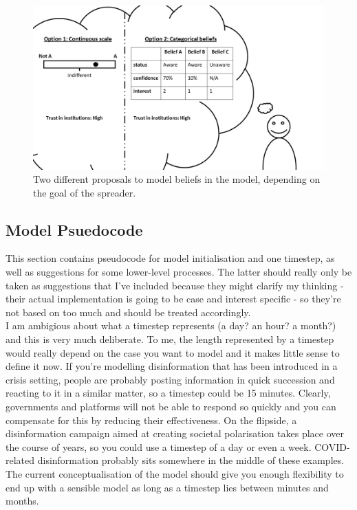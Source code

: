 \documentclass[10pt,a4paper]{article}
\begin{document}
\begin{figure}
	\includegraphics[scale=0.5]{internalstates}
	\centering
	\caption{Two different proposals to model beliefs in the model, depending on the goal of the spreader.}
	\label{img:beliefs}
\end{figure}



\subsection{Model Psuedocode}
This section contains pseudocode for model initialisation and one timestep, as well as suggestions for some lower-level processes. The latter should really only be taken as suggestions that I've included because they might clarify my thinking - their actual implementation is going to be case and interest specific - so they're not based on too much and should be treated accordingly. \\

I am ambigious about what a timestep represents (a day? an hour? a month?) and this is very much deliberate. To me, the length represented by a timestep would really depend on the case you want to model and it makes little sense to define it now. If you're modelling disinformation that has been introduced in a crisis setting, people are probably posting information in quick succession and reacting to it in a similar matter, so a timestep could be 15 minutes. Clearly, governments and platforms will not be able to respond so quickly and you can compensate for this by reducing their effectiveness. On the flipside, a disinformation campaign aimed at creating societal polarisation takes place over the course of years, so you could use a timestep of a day or even a week. COVID-related disinformation probably sits somewhere in the middle of these examples. The current conceptualisation of the model should give you enough flexibility to end up with a sensible model as long as a timestep lies between minutes and months.  \\ 
\end{document}
